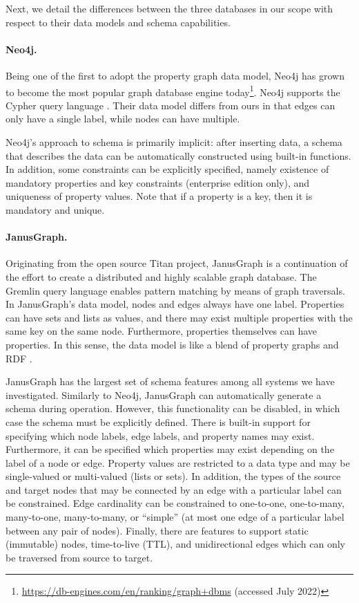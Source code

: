 \documentclass{report}
\theoremstyle{definition}
\begin{document}
Next, we detail the differences between the three databases in our scope with respect to their data models and schema capabilities.

\paragraph{Neo4j.} Being one of the first to adopt the property graph data model, Neo4j has grown to become the most popular graph database engine today\footnote{\url{https://db-engines.com/en/ranking/graph+dbms} (accessed July 2022)}. Neo4j supports the Cypher query language \citep{francis2018cypher}. Their data model differs from ours in that edges can only have a single label, while nodes can have multiple.

Neo4j's approach to schema is primarily implicit: after inserting data, a schema that describes the data can be automatically constructed using built-in functions. In addition, some constraints can be explicitly specified, namely existence of mandatory properties and key constraints (enterprise edition only), and uniqueness of property values. Note that if a property is a key, then it is mandatory and unique.

\paragraph{JanusGraph.} Originating from the open source Titan project, JanusGraph is a continuation of the effort to create a distributed and highly scalable graph database. The Gremlin query language \citep{rodriguez2015gremlin} enables pattern matching by means of graph traversals. In JanusGraph's data model, nodes and edges always have one label. Properties can have sets and lists as values, and there may exist multiple properties with the same key on the same node. Furthermore, properties themselves can have properties. In this sense, the data model is like a blend of property graphs and RDF \citep{pan2009rdf}.

JanusGraph has the largest set of schema features among all systems we have investigated. Similarly to Neo4j, JanusGraph can automatically generate a schema during operation. However, this functionality can be disabled, in which case the schema must be explicitly defined. There is built-in support for specifying which node labels, edge labels, and property names may exist. Furthermore, it can be specified which properties may exist depending on the label of a node or edge. Property values are restricted to a data type and may be single-valued or multi-valued (lists or sets). In addition, the types of the source and target nodes that may be connected by an edge with a particular label can be constrained. Edge cardinality can be constrained to one-to-one, one-to-many, many-to-one, many-to-many, or ``simple'' (at most one edge of a particular label between any pair of nodes). Finally, there are features to support static (immutable) nodes, time-to-live (TTL), and unidirectional edges which can only be traversed from source to target.
\end{document}
